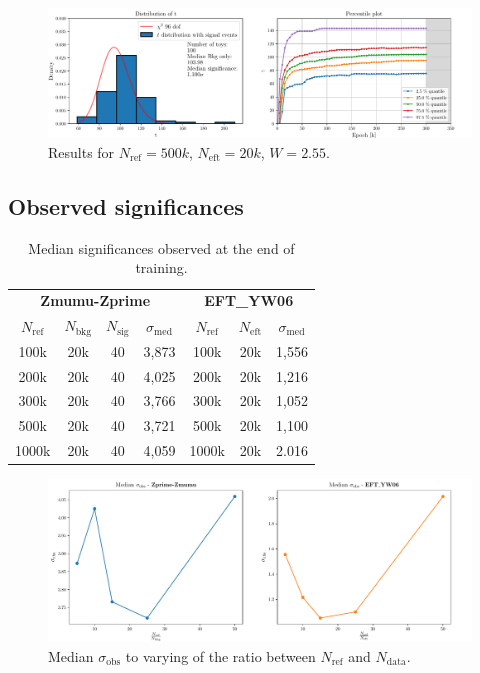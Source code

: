 \vspace{-5mm}
\begin{figure}[H]
	\centering
	\includegraphics[width=1.0\textwidth]{Python/RESULTS/ref500000_bkg0_eft20000/data_ref500000_bkg0_eft20000_wclip2-55.pdf}
	\caption{Results for $N_\mathrm{ref}=500\si{k}$, $N_\mathrm{eft}=20\si{k}$, $W=2.55$.}
	\label{fig:REF500000_BKG0_EFT20000_WCLIP2.55}
\end{figure}




\subsection*{Observed significances}

\begin{table}[H]
	\centering
	\begin{tabular}{c c c c c c c}
		\toprule
		\multicolumn{4}{c}{\textbf{Zmumu-Zprime}}	&	\multicolumn{3}{c}{\textbf{EFT\_YW06}}	\\
		$N_\mathrm{ref}$	&	$N_\mathrm{bkg}$	&	$N_\mathrm{sig}$	&	$\sigma_\mathrm{med}$	&	$N_\mathrm{ref}$	&	$N_\mathrm{eft}$	&	$\sigma_\mathrm{med}$	\\
		\midrule
		100k	&	20k	&	40	&	3,873	&	100k	&	20k	&	1,556	\\
		200k	&	20k	&	40	&	4,025	&	200k	&	20k	&	1,216	\\
		300k	&	20k	&	40	&	3,766	&	300k	&	20k	&	1,052	\\
		500k	&	20k	&	40	&	3,721	&	500k	&	20k	&	1,100	\\
		1000k	&	20k	&	40	&	4,059	&	1000k	&	20k	&	2.016	\\
		\bottomrule		
	\end{tabular}
	\caption{Median significances observed at the end of training.}
	\label{tab:MED_SIG}
\end{table}

\begin{figure}[H]
	\centering
	\includegraphics[width=1.0\textwidth]{Python/RESULTS/MED_SIG/med_sig_plot.pdf}
	\caption{Median $\sigma_\mathrm{obs}$ to varying of the ratio between $N_\mathrm{ref}$ and $N_\mathrm{data}$.}
	\label{fig:MED_SIG_CURVE}
\end{figure}

